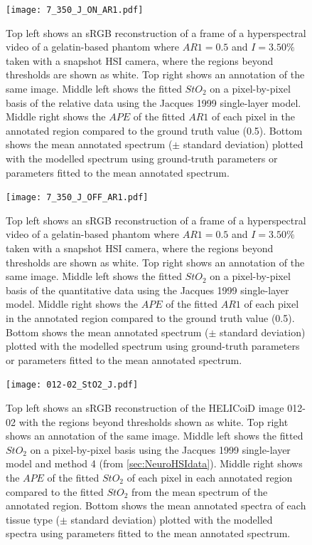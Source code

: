\begin{subappendices}
\begin{figure}[h!]
    \centering 
    \texttt{[image: 7\_350\_J\_ON\_AR1.pdf]}
    \caption{Top left shows an sRGB reconstruction of a frame of a hyperspectral video of a gelatin-based phantom where $AR1=0.5$ and $I=3.50\%$ taken with a snapshot HSI camera, where the regions beyond thresholds are shown as white. Top right shows an annotation of the same image. Middle left shows the fitted $StO_2$ on a pixel-by-pixel basis of the relative data using the Jacques 1999 single-layer model. Middle right shows the $APE$ of the fitted $AR1$ of each pixel in the annotated region compared to the ground truth value (0.5). Bottom shows the mean annotated spectrum ($\pm$ standard deviation) plotted with the modelled spectrum using ground-truth parameters or parameters fitted to the mean annotated spectrum.}
    \label{ap:gelatinpbpegRJ}
\end{figure}

\begin{figure}[h!]
    \centering 
    \texttt{[image: 7\_350\_J\_OFF\_AR1.pdf]}
    \caption{Top left shows an sRGB reconstruction of a frame of a hyperspectral video of a gelatin-based phantom where $AR1=0.5$ and $I=3.50\%$ taken with a snapshot HSI camera, where the regions beyond thresholds are shown as white. Top right shows an annotation of the same image. Middle left shows the fitted $StO_2$ on a pixel-by-pixel basis of the quantitative data using the Jacques 1999 single-layer model. Middle right shows the $APE$ of the fitted $AR1$ of each pixel in the annotated region compared to the ground truth value (0.5). Bottom shows the mean annotated spectrum ($\pm$ standard deviation) plotted with the modelled spectrum using ground-truth parameters or parameters fitted to the mean annotated spectrum.}
    \label{ap:gelatinpbpegQJ}
\end{figure}

\begin{figure}[h!]
    \centering 
    \texttt{[image: 012-02\_StO2\_J.pdf]}
    \caption{Top left shows an sRGB reconstruction of the HELICoiD image 012-02 with the regions beyond thresholds shown as white. Top right shows an annotation of the same image. Middle left shows the fitted $StO_2$ on a pixel-by-pixel basis using the Jacques 1999 single-layer model and method 4 (from \ref{sec:NeuroHSIdata}). Middle right shows the $APE$ of the fitted $StO_2$ of each pixel in each annotated region compared to the fitted $StO_2$ from the mean spectrum of the annotated region. Bottom shows the mean annotated spectra of each tissue type ($\pm$ standard deviation) plotted with the modelled spectra using parameters fitted to the mean annotated spectrum.}
    \label{ap:HELICoiDpixelJ}
\end{figure}
\FloatBarrier


\end{subappendices}
